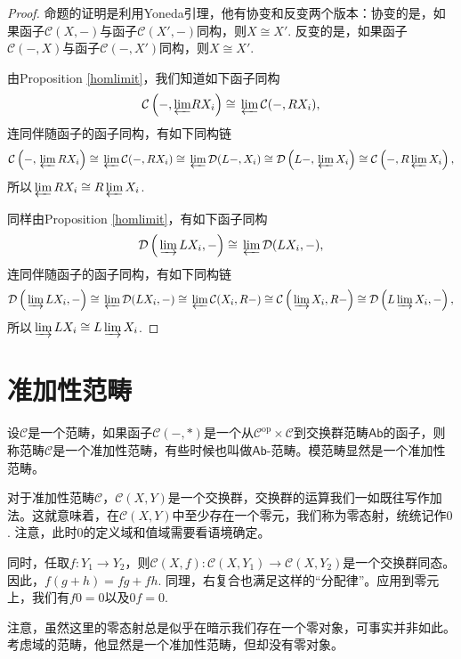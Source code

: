 \begin{proof}
	命题的证明是利用Yoneda引理，他有协变和反变两个版本：协变的是，如果函子$\mathcal{C}(X,-)$与函子$\mathcal{C}(X',-)$同构，则$X\cong X'$. 反变的是，如果函子$\mathcal{C}(-,X)$与函子$\mathcal{C}(-,X')$同构，则$X\cong X'$.

	由Proposition \ref{homlimit}，我们知道如下函子同构
	\[
	\mathcal{C}\left(-,{\varprojlim} RX_i\right)\cong {\,\varprojlim\,} \mathcal{C}(-,RX_i),
	\]
	连同伴随函子的函子同构，有如下同构链
	\[
	\mathcal{C}\left(-,{\,\varprojlim\,} RX_i\right)\cong {\,\varprojlim\,} \mathcal{C}(-,RX_i)\cong {\,\varprojlim\,} \mathcal{D}(L-,X_i)\cong \mathcal{D}\left(L-,{\,\varprojlim\,} X_i\right)\cong \mathcal{C}\left(-,R{\,\varprojlim\,} X_i\right),
	\]
	所以${\,\varprojlim\,} RX_i\cong R{\,\varprojlim\,} X_i$.

	同样由Proposition \ref{homlimit}，有如下函子同构
	\[
	\mathcal{D}\left({\,\varinjlim\,} LX_i,-\right)\cong {\,\varprojlim\,} \mathcal{D}(LX_i,-),
	\]
	连同伴随函子的函子同构，有如下同构链
	\[
	\mathcal{D}\left({\,\varinjlim\,} LX_i,-\right)\cong {\,\varprojlim\,} \mathcal{D}(LX_i,-)\cong {\,\varprojlim\,} \mathcal{C}(X_i,R-)\cong \mathcal{C}\left({\,\varinjlim\,} X_i,R-\right)\cong \mathcal{D}\left(L{\,\varinjlim\,} X_i,-\right),
	\]
	所以${\,\varinjlim\,} LX_i\cong L{\,\varinjlim\,} X_i$.
\end{proof}

\section{准加性范畴}

\begin{para}
设$\mathcal{C}$是一个范畴，如果函子$\mathcal{C}(-,*)$是一个从$\mathcal{C}^\text{op}\times \mathcal{C}$到交换群范畴$\mathsf{Ab}$的函子，则称范畴$\mathcal{C}$是一个准加性范畴，有些时候也叫做$\mathsf{Ab}$-范畴。模范畴显然是一个准加性范畴。
\end{para}

对于准加性范畴$\mathcal{C}$，$\mathcal{C}(X,Y)$是一个交换群，交换群的运算我们一如既往写作加法。这就意味着，在$\mathcal{C}(X,Y)$中至少存在一个零元，我们称为零态射，统统记作$0$. 注意，此时$0$的定义域和值域需要看语境确定。

同时，任取$f:Y_1\to Y_2$，则$\mathcal{C}(X,f):\mathcal{C}(X,Y_1)\to \mathcal{C}(X,Y_2)$是一个交换群同态。因此，$f(g+h)=fg+fh$. 同理，右复合也满足这样的“分配律”。应用到零元上，我们有$f0=0$以及$0f=0$.

注意，虽然这里的零态射总是似乎在暗示我们存在一个零对象，可事实并非如此。考虑域的范畴，他显然是一个准加性范畴，但却没有零对象。


